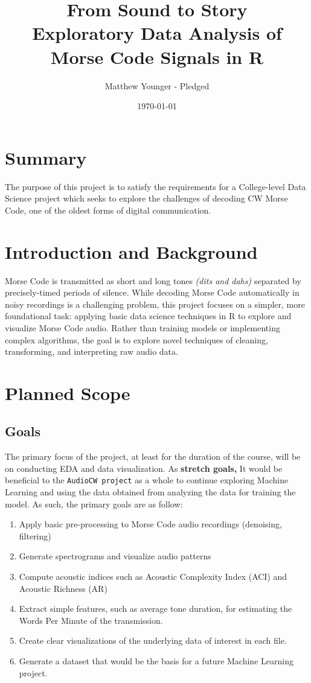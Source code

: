 \documentclass[11pt]{article}
\author{Matthew Younger - Pledged}
\date{\today}
\title{From Sound to Story\\\medskip
\large Exploratory Data Analysis of Morse Code Signals in R}
\begin{document}
\maketitle
\setcounter{tocdepth}{2}
\tableofcontents

\section{Summary}
\label{sec:orgf0ac273}
The purpose of this project is to satisfy the requirements for a College-level
Data Science project which seeks to explore the challenges of decoding CW Morse Code, one of the oldest
forms of digital communication.
\section{Introduction and Background}
\label{sec:org21c3053}
Morse Code is transmitted as short and long tones \emph{(dits and dahs)} separated by precisely-timed periods of silence.
While decoding Morse Code automatically in noisy recordings is a challenging problem, this project focuses on a simpler, more foundational task:
applying basic data science techniques in R to explore and visualize Morse Code audio. Rather than training models or implementing complex
algorithms, the goal is to explore novel techniques of cleaning, transforming, and interpreting raw audio data.
\section{Planned Scope}
\label{sec:org85b2d44}
\subsection{Goals}
\label{sec:orgb48aa8d}
The primary focus of the project, at least for the duration of the course, will be on conducting EDA and data visualization. As \textbf{stretch goals,}
It would be beneficial to the \texttt{AudioCW project} \autocite{audioCW} as a whole to continue exploring Machine Learning and using the data obtained from analyzing the data for
training the model. As such, the primary goals are as follow:

\begin{enumerate}
\item Apply basic pre-processing to Morse Code audio recordings (denoising, filtering)
\item Generate spectrograms and visualize audio patterns
\item Compute acoustic indices such as Acoustic Complexity Index (ACI) and Acoustic Richness (AR)
\item Extract simple features, such as average tone duration, for estimating the Words Per Minute of the transmission.
\item Create clear visualizations of the underlying data of interest in each file.
\item Generate a dataset that would be the basis for a future Machine Learning project.
\end{enumerate}
\end{document}
